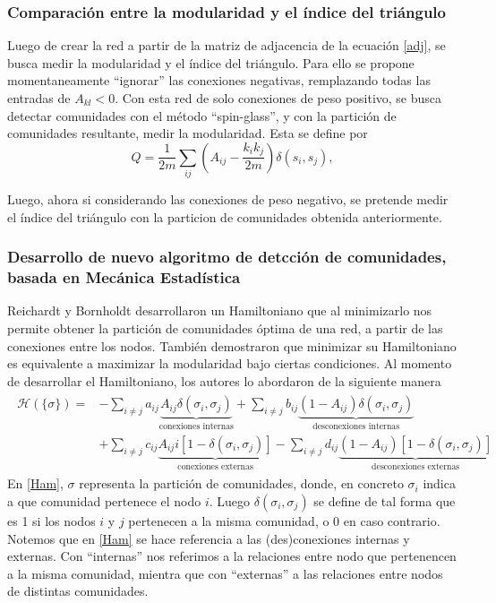 \documentclass{proyectotesis}
\begin{document}
\subsubsection{Comparación entre la modularidad y el índice del triángulo} Luego de crear la red a partir de la matriz de adjacencia de la ecuación \eqref{adj}, se busca medir la modularidad y el índice del triángulo. Para ello se propone momentaneamente ``ignorar'' las conexiones negativas, remplazando todas las entradas de $A_{kl} < 0$. Con esta red de solo conexiones de peso positivo, se busca detectar comunidades con el método ``spin-glass'', y con la partición de comunidades resultante, medir la modularidad. Esta se define por 
\begin{equation}
    Q = \frac{1}{2m}\sum_{ij} \left( A_{ij} - \frac{k_i k_j}{2m}  \right) \delta(s_i,s_j),
\end{equation}

Luego, ahora si considerando las conexiones de peso negativo, se pretende medir el índice del triángulo con la particion de comunidades obtenida anteriormente.

\subsubsection{Desarrollo de nuevo algoritmo de detcción de comunidades, basada en Mecánica Estadística} Reichardt y Bornholdt desarrollaron un Hamiltoniano que al minimizarlo nos permite obtener la partición de comunidades óptima de una red, a partir de las conexiones entre los nodos. También demostraron que minimizar su Hamiltoniano es equivalente a maximizar la modularidad bajo ciertas condiciones. 
Al momento de desarrollar el Hamiltoniano, los autores lo abordaron de la siguiente manera
\begin{align}
\begin{split}
    \mathcal{H}(\{\sigma\}) = &- \sum_{i\neq j} a_{ij}\underbrace{A_{ij}\delta(\sigma_i,\sigma_j)}_{\text{conexiones internas}} + \sum_{i\neq j} b_{ij}\underbrace{(1 - A_{ij})\delta(\sigma_i,\sigma_j)}_{\text{desconexiones internas}} \\
                              &+ \sum_{i\neq j} c_{ij} \underbrace{A_{ij}i[1 - \delta(\sigma_i,\sigma_j)] }_{\text{conexiones externas}} - \sum_{i\neq j} d_{ij} \underbrace{(1-A_{ij})[1 - \delta(\sigma_i,\sigma_j)]}_{\text{desconexiones externas}}
\end{split}
\label{Ham}
\end{align}
En \eqref{Ham}, $\sigma$ representa la partición de comunidades, donde, en concreto $\sigma_i$ indica a que comunidad pertenece el nodo $i$. Luego $\delta(\sigma_i,\sigma_j)$ se define de tal forma que es 1 si los nodos $i$ y $j$ pertenecen a la misma comunidad, o 0 en caso contrario. Notemos que en \eqref{Ham} se hace referencia a las (des)conexiones internas y externas. Con ``internas'' nos referimos a la relaciones entre nodo que pertenencen a la misma comunidad, mientra que con ``externas'' a las relaciones entre nodos de distintas comunidades.
\end{document}
